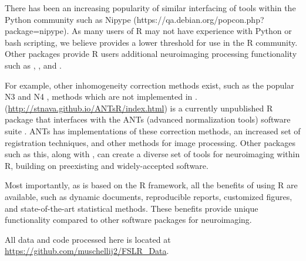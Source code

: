 There has been an increasing popularity of similar interfacing of tools within the Python community such as Nipype \citep{gorgolewski_nipype:_2011} (https://qa.debian.org/popcon.php?package=nipype).  As many users of R may not have experience with Python or bash scripting, we believe  provides a lower threshold for use in the R community.  Other packages provide R users additional neuroimaging processing functionality such as  \citep{bordier_temporal_2011},  \citep{modat_rniftyreg:_2013}, and  \citep{tabelow_statistical_2011}.   

For example, other inhomogeneity correction methods exist, such as the popular N3 \citep{sled_nonparametric_1998} and N4 \citep{tustison_n4itk:_2010}, methods which are not implemented in .  (\url{http://stnava.github.io/ANTsR/index.html}) is a currently unpublished R package that interfaces with the ANTs (advanced normalization tools) software suite \citep{avants_reproducible_2011}.  ANTs has implementations of these correction methods, an increased set of registration techniques, and other methods for image processing.  Other packages such as this, along with , can create a diverse set of tools for neuroimaging within R, building on preexisting and widely-accepted software.  


Most importantly, as  is based on the R framework, all the benefits of using R are available, such as dynamic documents, reproducible reports, customized figures, and state-of-the-art statistical methods.  These benefits provide unique functionality compared to other software packages for neuroimaging.  

All data and code processed here is located at \url{https://github.com/muschellij2/FSLR_Data}.  


%







